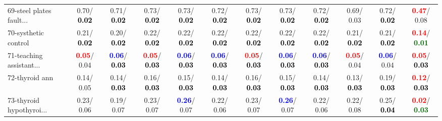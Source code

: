 \begin{table}[h]
\begin{center}
{\begin{tabular}{lc|c|c|c|c|c|c|c|c|c|c}
69-steel plates fault... &   0.70/\textcolor{black}{\textbf{  0.02}} &   0.71/\textcolor{black}{\textbf{  0.02}} &   0.73/\textcolor{black}{\textbf{  0.02}} &   0.73/\textcolor{black}{\textbf{  0.02}} &   0.72/\textcolor{black}{\textbf{  0.02}} &   0.73/\textcolor{black}{\textbf{  0.02}} &   0.73/\textcolor{black}{\textbf{  0.02}} &   0.72/\textcolor{black}{\textbf{  0.02}} &   0.69/  0.03 &   0.72/\textcolor{black}{\textbf{  0.02}} & \textcolor{red}{\textbf{  0.47}}/  0.08 \\
70-systhetic control &   0.21/\textcolor{black}{\textbf{  0.02}} &   0.20/\textcolor{black}{\textbf{  0.02}} &   0.22/\textcolor{black}{\textbf{  0.02}} &   0.22/\textcolor{black}{\textbf{  0.02}} &   0.22/\textcolor{black}{\textbf{  0.02}} &   0.22/\textcolor{black}{\textbf{  0.02}} &   0.22/\textcolor{black}{\textbf{  0.02}} &   0.22/\textcolor{black}{\textbf{  0.02}} &   0.21/\textcolor{black}{\textbf{  0.02}} &   0.21/\textcolor{black}{\textbf{  0.02}} & \textcolor{red}{\textbf{  0.14}}/\textcolor{darkgreen}{\textbf{  0.01}} \\
71-teaching assistant... & \textcolor{red}{\textbf{  0.05}}/  0.04 & \textcolor{blue}{\textbf{  0.06}}/\textcolor{black}{\textbf{  0.03}} & \textcolor{red}{\textbf{  0.05}}/\textcolor{black}{\textbf{  0.03}} & \textcolor{blue}{\textbf{  0.06}}/\textcolor{black}{\textbf{  0.03}} & \textcolor{blue}{\textbf{  0.06}}/\textcolor{black}{\textbf{  0.03}} & \textcolor{red}{\textbf{  0.05}}/\textcolor{black}{\textbf{  0.03}} & \textcolor{blue}{\textbf{  0.06}}/\textcolor{black}{\textbf{  0.03}} & \textcolor{blue}{\textbf{  0.06}}/\textcolor{black}{\textbf{  0.03}} & \textcolor{red}{\textbf{  0.05}}/  0.04 & \textcolor{blue}{\textbf{  0.06}}/  0.04 & \textcolor{red}{\textbf{  0.05}}/\textcolor{black}{\textbf{  0.03}} \\ \hline
72-thyroid ann &   0.14/  0.05 &   0.14/\textcolor{black}{\textbf{  0.03}} &   0.16/\textcolor{black}{\textbf{  0.03}} &   0.15/\textcolor{black}{\textbf{  0.03}} &   0.14/\textcolor{black}{\textbf{  0.03}} &   0.16/\textcolor{black}{\textbf{  0.03}} &   0.15/\textcolor{black}{\textbf{  0.03}} &   0.14/\textcolor{black}{\textbf{  0.03}} &   0.13/\textcolor{black}{\textbf{  0.03}} &   0.19/\textcolor{black}{\textbf{  0.03}} & \textcolor{red}{\textbf{  0.12}}/\textcolor{black}{\textbf{  0.03}} \\
73-thyroid hypothyroi... &   0.23/  0.06 &   0.19/  0.07 &   0.23/  0.07 & \textcolor{blue}{\textbf{  0.26}}/  0.07 &   0.22/  0.06 &   0.23/  0.07 & \textcolor{blue}{\textbf{  0.26}}/  0.07 &   0.22/  0.06 &   0.22/  0.08 &   0.25/\textcolor{black}{\textbf{  0.04}} & \textcolor{red}{\textbf{  0.02}}/\textcolor{darkgreen}{\textbf{  0.03}} \\

\end{tabular}}
\end{center}
\end{table}
